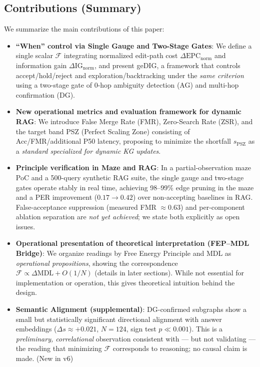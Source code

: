 \documentclass[12pt]{article}
\newcommand{\F}{\mathcal{F}}
\newcommand{\gednorm}{\Delta\mathrm{EPC}_{\mathrm{norm}}}
\newcommand{\ignorm}{\Delta\mathrm{IG}_{\mathrm{norm}}}
\begin{document}
\subsection*{Contributions (Summary)}
We summarize the main contributions of this paper:
\begin{itemize}[leftmargin=1.6em]
  \item \textbf{``When'' control via Single Gauge and Two-Stage Gates}: We define a single scalar $\F$ integrating normalized edit-path cost $\gednorm$ and information gain $\ignorm$, and present geDIG, a framework that controls accept/hold/reject and exploration/backtracking under the \emph{same criterion} using a two-stage gate of 0-hop ambiguity detection (AG) and multi-hop confirmation (DG).
  \item \textbf{New operational metrics and evaluation framework for dynamic RAG}: We introduce False Merge Rate (FMR), Zero-Search Rate (ZSR), and the target band PSZ (Perfect Scaling Zone) consisting of Acc/FMR/additional P50 latency, proposing to minimize the shortfall $s_{\mathrm{PSZ}}$ as a \emph{standard specialized for dynamic KG updates}.
  \item \textbf{Principle verification in Maze and RAG}: In a partial-observation maze PoC and a 500-query synthetic RAG suite, the single gauge and two-stage gates operate stably in real time, achieving 98--99\% edge pruning in the maze and a PER improvement ($0.17\to0.42$) over non-accepting baselines in RAG. False-acceptance suppression (measured FMR $\approx 0.63$) and per-component ablation separation are \emph{not yet achieved}; we state both explicitly as open issues.
  \item \textbf{Operational presentation of theoretical interpretation (FEP--MDL Bridge)}: We organize readings by Free Energy Principle and MDL as \emph{operational propositions}, showing the correspondence $\F\propto\Delta\mathrm{MDL}{+}O(1/N)$ (details in later sections). While not essential for implementation or operation, this gives theoretical intuition behind the design.
  \item \textbf{Semantic Alignment (supplemental)}: DG-confirmed subgraphs show a small but statistically significant directional alignment with answer embeddings ($\Delta s \approx +0.021$, $N{=}124$, sign test $p\ll0.001$). This is a \emph{preliminary, correlational} observation consistent with --- but not validating --- the reading that minimizing $\F$ corresponds to reasoning; no causal claim is made. (New in v6)
\end{itemize}
\end{document}
